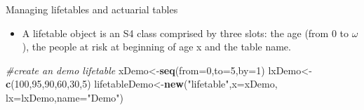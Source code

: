 \documentclass[ignorenonframetext,]{beamer}
\newenvironment{Shaded}{\begin{snugshade}}{\end{snugshade}}
\newcommand{\KeywordTok}[1]{\textcolor[rgb]{0.13,0.29,0.53}{\textbf{{#1}}}}
\newcommand{\DataTypeTok}[1]{\textcolor[rgb]{0.13,0.29,0.53}{{#1}}}
\newcommand{\DecValTok}[1]{\textcolor[rgb]{0.00,0.00,0.81}{{#1}}}
\newcommand{\StringTok}[1]{\textcolor[rgb]{0.31,0.60,0.02}{{#1}}}
\newcommand{\CommentTok}[1]{\textcolor[rgb]{0.56,0.35,0.01}{\textit{{#1}}}}
\newcommand{\NormalTok}[1]{{#1}}
\begin{document}
\begin{frame}[fragile]{Managing lifetables and actuarial tables}

\begin{itemize}[<+->]
\itemsep1pt\parskip0pt
\item
  A lifetable object is an S4 class comprised by three slots: the age
  (from 0 to $\omega$), the people at risk at beginning of age x and the
  table name.
\end{itemize}

\begin{Shaded}
\begin{Highlighting}[]
\CommentTok{#create an demo lifetable}
\NormalTok{xDemo<-}\KeywordTok{seq}\NormalTok{(}\DataTypeTok{from=}\DecValTok{0}\NormalTok{,}\DataTypeTok{to=}\DecValTok{5}\NormalTok{,}\DataTypeTok{by=}\DecValTok{1}\NormalTok{)}
\NormalTok{lxDemo<-}\KeywordTok{c}\NormalTok{(}\DecValTok{100}\NormalTok{,}\DecValTok{95}\NormalTok{,}\DecValTok{90}\NormalTok{,}\DecValTok{60}\NormalTok{,}\DecValTok{30}\NormalTok{,}\DecValTok{5}\NormalTok{)}
\NormalTok{lifetableDemo<-}\KeywordTok{new}\NormalTok{(}\StringTok{"lifetable"}\NormalTok{,}\DataTypeTok{x=}\NormalTok{xDemo,}
                   \DataTypeTok{lx=}\NormalTok{lxDemo,}\DataTypeTok{name=}\StringTok{"Demo"}\NormalTok{)}
\end{Highlighting}
\end{Shaded}

\end{frame}
\end{document}
